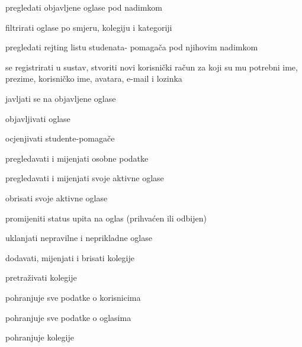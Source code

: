 			
			\begin{packed_enum}
				\item  {}
				
				\begin{packed_enum}
					
					\item pregledati objavljene oglase pod nadimkom
					\item filtrirati oglase po smjeru, kolegiju i kategoriji
					\item pregledati rejting listu studenata- pomagača pod njihovim nadimkom
					\item se registrirati u sustav, stvoriti novi korisnički račun za koji su mu potrebni  ime, prezime, korisničko ime, avatara, e-mail i lozinka
					
				\end{packed_enum}
			
				\item  {}
				
				\begin{packed_enum}
					
					\item javljati se na objavljene oglase
					\item objavljivati oglase
					\item ocjenjivati studente-pomagače
					\item pregledavati i mijenjati osobne podatke
					\item pregledavati i mijenjati svoje aktivne oglase
					\item obrisati svoje aktivne oglase
					\item promijeniti status upita na oglas (prihvaćen ili odbijen)
					
				\end{packed_enum}
			
				\item  {}
				
				\begin{packed_enum}
					
					\item uklanjati nepravilne i neprikladne oglase
					\item dodavati, mijenjati i brisati kolegije
					\item pretraživati kolegije
					
				\end{packed_enum}
			
				\item  {}
				
				\begin{packed_enum}
					
					\item pohranjuje sve podatke o korisnicima 
					\item pohranjuje sve podatke o oglasima
					\item pohranjuje kolegije
					
				\end{packed_enum}
			\end{packed_enum}
			
